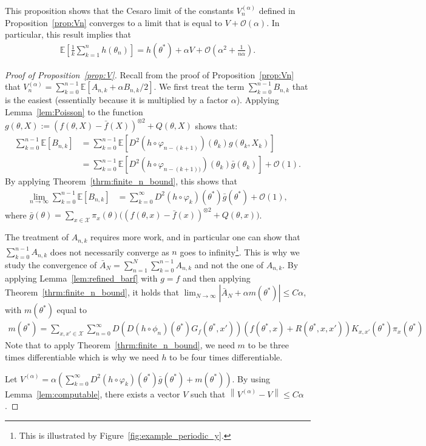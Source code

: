 \documentclass{article}
\newcommand{\calX}{\mathcal{X}}
\newcommand\E{\mathbb{E}}
\newcommand\esp[1]{\E\left[#1\right]}
\newcommand\abs[1]{\left|#1\right|}
\newcommand\norm[1]{\left\|#1\right\|}
\newcommand\toA{^{(\alpha)}}
\newcommand\bO[1]{\mathcal{O}(#1)}
\newcommand\barf{\bar{f}}
\begin{document}
This proposition shows that the Cesaro limit of the constants $V\toA_{n}$ defined in Proposition~\ref{prop:Vn} converges to a limit that is equal to $V+\bO{\alpha}$. In particular, this result implies that
\begin{align*}
    \esp{\frac1k\sum_{k=1}^n h(\theta_n)} = h(\theta^*) + \alpha V + \bO{\alpha^2 + \frac{1}{n\alpha}}.
\end{align*}


\begin{proof}[Proof of Proposition~\ref{prop:V}]
    Recall from the proof of Proposition~\ref{prop:Vn} that $V\toA_n=\sum_{k=0}^{n-1}\esp{A_{n,k} + \alpha B_{n,k}/2}$. We first treat the term $\sum_{k=0}^{n-1}B_{n,k}$ that is the easiest (essentially because it is multiplied by a factor $\alpha$). Applying Lemma~\ref{lem:Poisson} to the function $g(\theta,X):=(f (\theta,X)-\barf(X))^{\otimes 2} + Q(\theta,X)$ shows that: 
    \begin{align*}
        \sum_{k=0}^{n-1}\esp{B_{n,k}} &= \sum_{k=0}^{n-1}\esp{D^2(h\circ\varphi_{n-(k+1)})(\theta_k)g(\theta_k,X_k)}\\
        &= \sum_{k=0}^{n-1} \esp{D^2(h\circ\varphi_{n-(k+1))})(\theta_k)\bar{g}(\theta_k)} + \bO{1}.
    \end{align*}
    By applying Theorem~\ref{thrm:finite_n_bound}, this shows that
    \begin{align}
        \label{eq:limit_B_n_k}
        \lim_{n\to\infty} \sum_{k=0}^{n-1}\esp{B_{n,k}} &= \sum_{k=0}^{\infty} D^2(h\circ\varphi_{k})(\theta^*)\bar{g}(\theta^*) + \bO{1},
    \end{align}
    where $\bar{g}(\theta)=\sum_{x\in\calX}\pi_x(\theta)\bigl((f (\theta,x)-\barf(x))^{\otimes 2} + Q(\theta,x)\bigr)$. 

    The treatment of $A_{n,k}$ requires more work, and in particular one can show that $\sum_{k=0}^{n-1}A_{n,k}$ does not necessarily converge as $n$ goes to infinity\footnote{This is illustrated by Figure~\ref{fig:example_periodic_y}.}. This is why we study the convergence of $\bar{A}_{N} = \sum_{n=1}^N\sum_{k=0}^{n-1}A_{n,k}$ and not the one of $A_{n,k}$. By applying Lemma~\ref{lem:refined_barf} with $g=f$ and then applying Theorem~\ref{thrm:finite_n_bound}, it holds that $\lim_{N\to\infty}\abs{\bar{A}_N + \alpha m(\theta^*)}\le C\alpha$, with $m(\theta^*)$ equal to 
    \begin{align*}
        m(\theta^*) = \sum_{x,x'\in\calX} \sum_{n=0}^\infty D(D(h\circ\phi_n)(\theta^*) G_f(\theta^*, x'))(f(\theta^*,x)+R(\theta^*,x,x'))K_{x,x'}(\theta^*)\pi_x(\theta^*)
    \end{align*}
    Note that to apply Theorem~\ref{thrm:finite_n_bound}, we need $m$ to be three times differentiable which is why we need $h$ to be four times differentiable. 

    Let $V\toA = \alpha(\sum_{k=0}^{\infty} D^2(h\circ\varphi_{k})(\theta^*)\bar{g}(\theta^*) + m(\theta^*))$. By using Lemma~\ref{lem:computable}, there exists a vector $V$ such that $\norm{V\toA-V}\le C\alpha$.
\end{proof}
\end{document}
